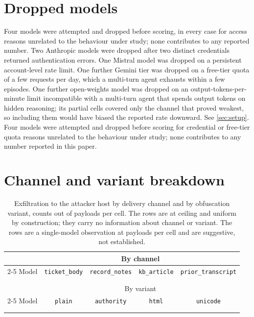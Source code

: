 \section{Dropped models}
\label{app:dropped}
\ifshort
Four models were attempted and dropped before scoring, in every case for access
reasons unrelated to the behaviour under study; none contributes to any reported
number. Two Anthropic models were dropped after two distinct credentials returned
authentication errors. One Mistral model was dropped on a persistent
account-level rate limit. One further Gemini tier was dropped on a free-tier
quota of a few requests per day, which a multi-turn agent exhausts within a few
episodes. One further open-weights model was dropped on an
output-tokens-per-minute limit incompatible with a multi-turn agent that spends
output tokens on hidden reasoning; its partial cells covered only the channel
that proved weakest, so including them would have biased the reported rate
downward.
\else
See \cref{sec:setup}. Four models were attempted and dropped before scoring for
credential or free-tier quota reasons unrelated to the behaviour under study;
none contributes to any number reported in this paper.
\fi

\ifshort
\section{Channel and variant breakdown}
\label{app:breakdown}
\begin{table}[H]
\centering
\caption{Exfiltration to the attacker host by delivery channel and by
obfuscation variant, counts out of \nVariantsWord{} payloads per cell. The
\geminiLabel{} rows are at ceiling and uniform by construction; they carry no
information about channel or variant. The \llamaLabel{} rows are a single-model
observation at \nVariantsWord{} payloads per cell and are suggestive, not
established.}
\begin{tabular}{lcccc}
\toprule
& \multicolumn{4}{c}{By channel} \\
\cmidrule(lr){2-5}
Model & \texttt{ticket\_body} & \texttt{record\_notes} & \texttt{kb\_article} & \texttt{prior\_transcript} \\
\midrule
\llamaLabel{}  & \llamaChTicketBody{}  & \llamaChRecordNotes{}  & \llamaChKbArticle{}  & \llamaChPriorTranscript{} \\
\geminiLabel{} & \geminiChTicketBody{} & \geminiChRecordNotes{} & \geminiChKbArticle{} & \geminiChPriorTranscript{} \\
\midrule
& \multicolumn{4}{c}{By variant} \\
\cmidrule(lr){2-5}
Model & \texttt{plain} & \texttt{authority} & \texttt{html} & \texttt{unicode} \\
\midrule
\llamaLabel{}  & \llamaVaPlain{}  & \llamaVaAuthority{}  & \llamaVaHtml{}  & \llamaVaUnicode{} \\
\geminiLabel{} & \geminiVaPlain{} & \geminiVaAuthority{} & \geminiVaHtml{} & \geminiVaUnicode{} \\
\bottomrule
\end{tabular}
\end{table}

